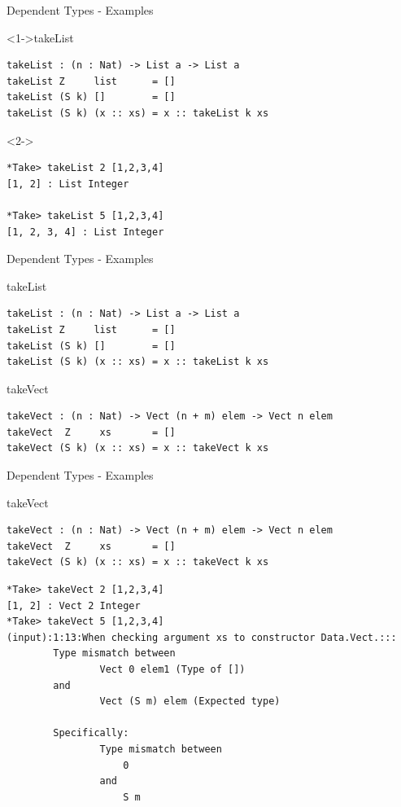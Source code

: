 \documentclass{beamer}
\begin{document}
	\begin{frame}[fragile]{Dependent Types - Examples}
		\begin{block}<1->{takeList}
			\begin{lstlisting}[basicstyle=\ttfamily\scriptsize]
takeList : (n : Nat) -> List a -> List a
takeList Z     list      = []
takeList (S k) []        = []
takeList (S k) (x :: xs) = x :: takeList k xs
			\end{lstlisting}
		\end{block}
		\begin{block}<2->{}
		\begin{lstlisting}[basicstyle=\ttfamily\scriptsize]
*Take> takeList 2 [1,2,3,4]
[1, 2] : List Integer
			
*Take> takeList 5 [1,2,3,4]
[1, 2, 3, 4] : List Integer
		\end{lstlisting}
	\end{block}
	\end{frame}
	\begin{frame}[fragile]{Dependent Types - Examples}
		\begin{block}{takeList}
			\begin{lstlisting}[basicstyle=\ttfamily\scriptsize]
takeList : (n : Nat) -> List a -> List a
takeList Z     list      = []
takeList (S k) []        = []
takeList (S k) (x :: xs) = x :: takeList k xs
			\end{lstlisting}
		\end{block}
		\begin{block}{takeVect}
		\begin{lstlisting}[basicstyle=\ttfamily\scriptsize]
takeVect : (n : Nat) -> Vect (n + m) elem -> Vect n elem
takeVect  Z     xs       = []
takeVect (S k) (x :: xs) = x :: takeVect k xs
		\end{lstlisting}
	\end{block}
	
	\end{frame}
	
	\begin{frame}[fragile]{Dependent Types - Examples}
		\begin{block}{takeVect}
			\begin{lstlisting}[basicstyle=\ttfamily\scriptsize]
takeVect : (n : Nat) -> Vect (n + m) elem -> Vect n elem
takeVect  Z     xs       = []
takeVect (S k) (x :: xs) = x :: takeVect k xs
			\end{lstlisting}
		\end{block}
		\begin{block}{}
			\begin{lstlisting}[basicstyle=\ttfamily\scriptsize]
*Take> takeVect 2 [1,2,3,4]
[1, 2] : Vect 2 Integer
*Take> takeVect 5 [1,2,3,4]
(input):1:13:When checking argument xs to constructor Data.Vect.:::
		Type mismatch between
				Vect 0 elem1 (Type of [])
		and
				Vect (S m) elem (Expected type)
				
		Specifically:
				Type mismatch between
					0
				and
					S m
			\end{lstlisting}
		\end{block}
	\end{frame}
	
\end{document}
